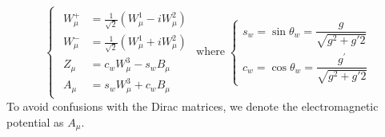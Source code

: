 \begin{equation}
\begin{cases}
	\begin{aligned}
		W_{\mu}^{+} &=\frac{1}{\sqrt{2}}\left(W_{\mu}^{1}-i W_{\mu}^{2}\right) \\
		W_{\mu}^{-} &=\frac{1}{\sqrt{2}}\left(W_{\mu}^{1}+i W_{\mu}^{2}\right) \\
		Z_{\mu} &=c_{w} W_{\mu}^{3}-s_{w} B_{\mu} \\
		A_{\mu} &=s_{w} W_{\mu}^{3}+c_{w} B_{\mu}
	\end{aligned}
\end{cases}
\text{where}
\;
\begin{cases}
	s_{w}=\sin \theta_{w}=\dfrac{g}{\sqrt{g^{2}+g{\prime2}}}\\
	c_{w}=\cos \theta_{w}=\dfrac{g^\prime}{\sqrt{g^{2}+g{\prime2}}}
\end{cases}
\end{equation}
To avoid confusions with the Dirac matrices, we denote the electromagnetic potential as $A_\mu$.


